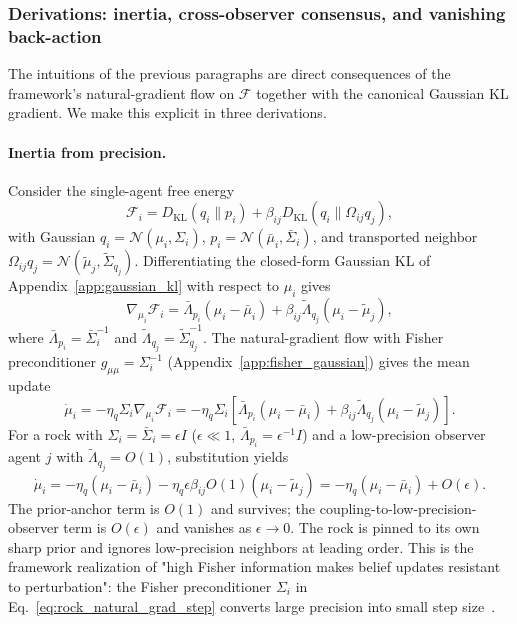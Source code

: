 \documentclass[11pt]{article}
\begin{document}
\subsubsection{Derivations: inertia, cross-observer consensus, and vanishing back-action}
\label{sec:rock_derivations}

The intuitions of the previous paragraphs are direct consequences of the framework's natural-gradient flow on $\mathcal{F}$ together with the canonical Gaussian KL gradient. We make this explicit in three derivations.

\paragraph{Inertia from precision.} Consider the single-agent free energy
\begin{equation}
\mathcal{F}_i = D_{\mathrm{KL}}(q_i \| p_i) + \beta_{ij} D_{\mathrm{KL}}(q_i \| \Omega_{ij} q_j),
\end{equation}
with Gaussian $q_i = \mathcal{N}(\mu_i, \Sigma_i)$, $p_i = \mathcal{N}(\bar{\mu}_i, \bar{\Sigma}_i)$, and transported neighbor $\Omega_{ij} q_j = \mathcal{N}(\tilde{\mu}_j, \tilde{\Sigma}_{q_j})$. Differentiating the closed-form Gaussian KL of Appendix~\ref{app:gaussian_kl} with respect to $\mu_i$ gives
\begin{equation}
\nabla_{\mu_i}\mathcal{F}_i = \bar{\Lambda}_{p_i}(\mu_i - \bar{\mu}_i) + \beta_{ij}\tilde{\Lambda}_{q_j}(\mu_i - \tilde{\mu}_j),
\label{eq:rock_grad_mu}
\end{equation}
where $\bar{\Lambda}_{p_i} = \bar{\Sigma}_i^{-1}$ and $\tilde{\Lambda}_{q_j} = \tilde{\Sigma}_{q_j}^{-1}$. The natural-gradient flow with Fisher preconditioner $g_{\mu\mu} = \Sigma_i^{-1}$ (Appendix~\ref{app:fisher_gaussian}) gives the mean update
\begin{equation}
\dot{\mu}_i = -\eta_q \Sigma_i \nabla_{\mu_i}\mathcal{F}_i = -\eta_q\Sigma_i\left[\bar{\Lambda}_{p_i}(\mu_i - \bar{\mu}_i) + \beta_{ij}\tilde{\Lambda}_{q_j}(\mu_i - \tilde{\mu}_j)\right].
\label{eq:rock_natural_grad_step}
\end{equation}
For a rock with $\Sigma_i = \bar{\Sigma}_i = \epsilon I$ ($\epsilon \ll 1$, $\bar{\Lambda}_{p_i} = \epsilon^{-1} I$) and a low-precision observer agent $j$ with $\tilde{\Lambda}_{q_j} = O(1)$, substitution yields
\begin{equation}
\dot{\mu}_i = -\eta_q(\mu_i - \bar{\mu}_i) - \eta_q \epsilon \beta_{ij} O(1) (\mu_i - \tilde{\mu}_j) = -\eta_q(\mu_i - \bar{\mu}_i) + O(\epsilon).
\label{eq:rock_inertia}
\end{equation}
The prior-anchor term is $O(1)$ and survives; the coupling-to-low-precision-observer term is $O(\epsilon)$ and vanishes as $\epsilon \to 0$. The rock is pinned to its own sharp prior and ignores low-precision neighbors at leading order. This is the framework realization of "high Fisher information makes belief updates resistant to perturbation": the Fisher preconditioner $\Sigma_i$ in Eq.~\eqref{eq:rock_natural_grad_step} converts large precision into small step size~\cite{Amari2016}.
\end{document}
